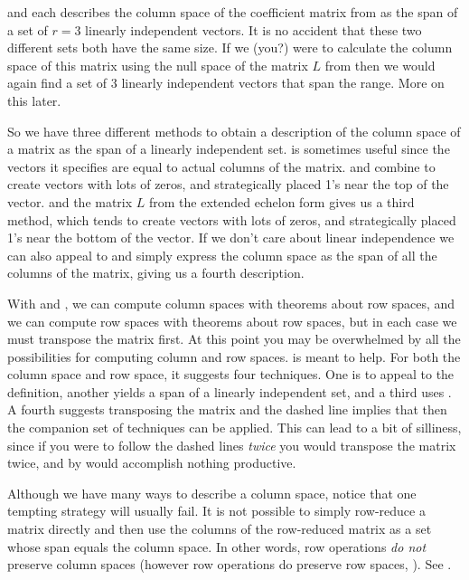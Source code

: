 %
%
 and  each describes the column space of the coefficient matrix from  as the span of a set of $r=3$ linearly independent vectors.  It is no accident that these two different sets both have the same size.  If we (you?) were to calculate the column space of this matrix using the null space of the matrix $L$ from  then we would again find a set of 3 linearly independent vectors that span the range.  More on this later.\par
%
So we have three different methods to obtain a description of the column space of a matrix as the span of a linearly independent set.   is sometimes useful since the vectors it specifies are equal to actual columns of the matrix.  and  combine to create vectors with lots of zeros, and strategically placed 1's near the top of the vector.    and the matrix $L$ from the extended echelon form gives us a third method, which tends to create vectors with lots of zeros, and strategically placed 1's near the bottom of the vector.   If we don't care about linear independence we can also appeal to  and simply express the column space as the span of all the columns of the matrix, giving us a fourth description.\par
%
With  and , we can compute column spaces with theorems about row spaces, and we can compute row spaces with theorems about row spaces, but in each case we must transpose the matrix first.  At this point you may be overwhelmed by all the possibilities for computing column and row spaces.   is meant to help.  For both the column space and row space, it suggests four techniques.  One is to appeal to the definition, another yields a span of a linearly independent set, and a third uses .  A fourth suggests transposing the matrix and the dashed line implies that then the companion set of techniques can be applied.  This can lead to a bit of silliness, since if you were to follow the dashed lines {\em twice} you would transpose the matrix twice, and by  would accomplish nothing productive.\par
%
%
Although we have many ways to describe a column space, notice that one tempting strategy will usually fail.  It is not possible to simply row-reduce a matrix directly and then use the columns of the row-reduced matrix as a set whose span equals the column space.  In other words, row operations {\em do not} preserve column spaces (however row operations do preserve row spaces, ).  See .
%





